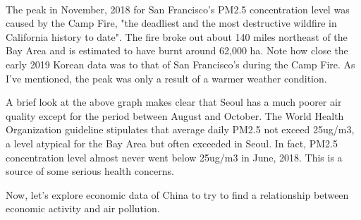 \documentclass[11pt]{article}
\begin{document}
    \begin{center}
    \end{center}
    { \hspace*{\fill} \\}
    
    The peak in November, 2018 for San Francisco's PM2.5 concentration level
was caused by the Camp Fire, "the deadliest and the most destructive
wildfire in California history to date". The fire broke out about 140
miles northeast of the Bay Area and is estimated to have burnt around
62,000 ha. Note how close the early 2019 Korean data was to that of San
Francisco's during the Camp Fire. As I've mentioned, the peak was only a
result of a warmer weather condition.

A brief look at the above graph makes clear that Seoul has a much poorer
air quality except for the period between August and October. The World
Health Organization guideline stipulates that average daily PM2.5 not
exceed 25ug/m3, a level atypical for the Bay Area but often exceeded in
Seoul. In fact, PM2.5 concentration level almost never went below
25ug/m3 in June, 2018. This is a source of some serious health concerns.

Now, let's explore economic data of China to try to find a relationship
between economic activity and air pollution.
\end{document}
